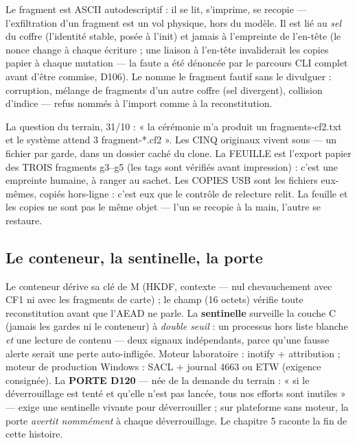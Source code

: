 Le fragment est ASCII autodescriptif : il se lit, s'imprime, se recopie — l'exfiltration
d'un fragment est un vol physique, hors du modèle. Il est lié au \emph{sel} du coffre
(l'identité stable, posée à l'init) et jamais à l'empreinte de l'en-tête (le nonce
change à chaque écriture ; une liaison à l'en-tête invaliderait les copies papier à
chaque mutation — la faute a été dénoncée par le parcours CLI complet avant d'être
commise, D106). Le  nomme le fragment fautif sans le divulguer : corruption,
mélange de fragments d'un autre coffre (sel divergent), collision d'indice — refus
nommés à l'import comme à la reconstitution.

\begin{terrain}
La question du terrain, 31/10 : « la cérémonie m'a produit un fragments-cf2.txt et le
système attend 3 fragment-*.cf2 ». Les CINQ originaux vivent sous
 — un fichier par garde, dans un dossier caché du clone. La FEUILLE
est l'export papier des TROIS fragments g3--g5 (les tags sont vérifiés avant
impression) : c'est une empreinte humaine, à ranger au sachet. Les COPIES USB sont les
fichiers  eux-mêmes, copiés hors-ligne : c'est eux que le contrôle de
relecture relit. La feuille et les copies ne sont pas le même objet — l'un se recopie
à la main, l'autre se restaure.
\end{terrain}

\subsection{Le conteneur, la sentinelle, la porte}

Le conteneur  dérive sa clé de M (HKDF, contexte  —
nul chevauchement avec CF1 ni avec les fragments de carte) ; le champ 
(16 octets) vérifie toute reconstitution avant que l'AEAD ne parle. La
\textbf{sentinelle} surveille la couche C (jamais les gardes ni le conteneur) à
\emph{double seuil} : un processus hors liste blanche \emph{et} une lecture de
contenu — deux signaux indépendants, parce qu'une fausse alerte serait une perte
auto-infligée. Moteur laboratoire : inotify + attribution  ; moteur de
production Windows : SACL + journal 4663 ou ETW (exigence consignée). La
\textbf{PORTE D120} — née de la demande du terrain : « si le déverrouillage est tenté
et qu'elle n'est pas lancée, tous nos efforts sont inutiles » — exige une sentinelle
vivante pour déverrouiller ; sur plateforme sans moteur, la porte \emph{avertit
nommément} à chaque déverrouillage. Le chapitre 5 raconte la fin de cette histoire.

